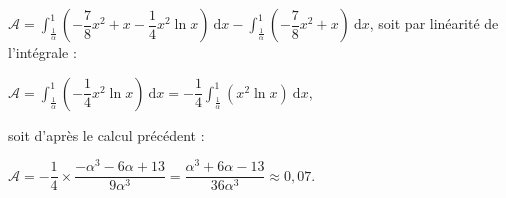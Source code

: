 \documentclass[10pt]{article}
\begin{document}
\begin{enumerate}
$\mathcal{A} = \displaystyle\int_\frac{1}{\alpha}^1 \left(- \dfrac78 x^2 + x - \dfrac14 x^2 \ln x\right)\:\text{d}x - \displaystyle\int_\frac{1}{\alpha}^1 \left(- \dfrac78 x^2 + x \right)\:\text{d}x$, soit par linéarité de l'intégrale :

$\mathcal{A} = \displaystyle\int_\frac{1}{\alpha}^1 \left( - \dfrac14 x^2 \ln x\right)\:\text{d}x = - \dfrac14 \displaystyle\int_\frac{1}{\alpha}^1 \left(x^2 \ln x\right)\:\text{d}x$,

soit d'après le calcul précédent :

$\mathcal{A} = - \dfrac14  \times \dfrac{- \alpha^3 - 6\alpha + 13}{9\alpha^3} = \dfrac{\alpha^3 + 6\alpha - 13}{36\alpha^3} \approx 0,07$.
\end{enumerate}
\end{document}
